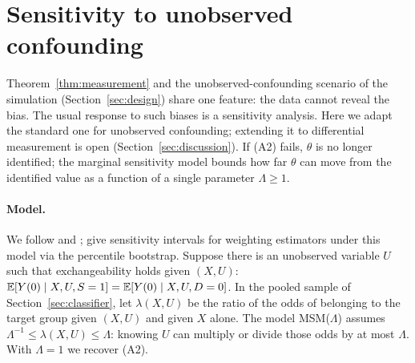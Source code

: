 \section{Sensitivity to unobserved confounding}\label{sec:sensitivity}

Theorem~\ref{thm:measurement} and the unobserved-confounding scenario of the simulation (Section~\ref{sec:design}) share one feature: the data cannot reveal the bias. The usual response to such biases is a sensitivity analysis. Here we adapt the standard one for unobserved confounding; extending it to differential measurement is open (Section~\ref{sec:discussion}). If (A2) fails, $\theta$ is no longer identified; the marginal sensitivity model bounds how far $\theta$ can move from the identified value as a function of a single parameter $\Lambda\ge1$.

\paragraph{Model.} We follow \citet{tan2006} and \citet{dorn2023}; \citet{zhao2019} give sensitivity intervals for weighting estimators under this model via the percentile bootstrap. Suppose there is an unobserved variable $U$ such that exchangeability holds given $(X,U)$: $\mathbb{E}[Y(0)\mid X,U,S=1]=\mathbb{E}[Y(0)\mid X,U,D=0]$. In the pooled sample of Section~\ref{sec:classifier}, let $\lambda(X,U)$ be the ratio of the odds of belonging to the target group given $(X,U)$ and given $X$ alone. The model MSM($\Lambda$) assumes $\Lambda^{-1}\le\lambda(X,U)\le\Lambda$: knowing $U$ can multiply or divide those odds by at most $\Lambda$. With $\Lambda=1$ we recover (A2).

